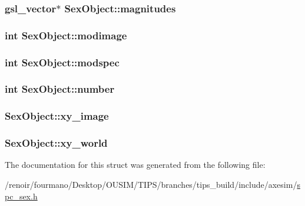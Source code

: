 \label{structSexObject_afbbb8f8bd937e942e0f9aa9560097b13}
\hypertarget{structSexObject_afcb11ccfb82237107b71410de52d9b79}{
\subsubsection[{magnitudes}]{\setlength{\rightskip}{0pt plus 5cm}gsl\_\-vector$\ast$ {\bf SexObject::magnitudes}}}
\label{structSexObject_afcb11ccfb82237107b71410de52d9b79}
\hypertarget{structSexObject_acfe99bcffce1874072c406bf4517cd07}{
\subsubsection[{modimage}]{\setlength{\rightskip}{0pt plus 5cm}int {\bf SexObject::modimage}}}
\label{structSexObject_acfe99bcffce1874072c406bf4517cd07}
\hypertarget{structSexObject_a0f462eb5c84b02f2bbdeb4d02dd76f5b}{
\subsubsection[{modspec}]{\setlength{\rightskip}{0pt plus 5cm}int {\bf SexObject::modspec}}}
\label{structSexObject_a0f462eb5c84b02f2bbdeb4d02dd76f5b}
\hypertarget{structSexObject_ad41b1dda3b8dba7dd6e53098efaafd23}{
\subsubsection[{number}]{\setlength{\rightskip}{0pt plus 5cm}int {\bf SexObject::number}}}
\label{structSexObject_ad41b1dda3b8dba7dd6e53098efaafd23}
\hypertarget{structSexObject_aeb623e63f7277a5f81f85f0d213c6bbd}{
\subsubsection[{xy\_\-image}]{ {\bf SexObject::xy\_\-image}}}
\label{structSexObject_aeb623e63f7277a5f81f85f0d213c6bbd}
\hypertarget{structSexObject_af314bec47ffaac3fe444f43a5f942d0d}{
\subsubsection[{xy\_\-world}]{ {\bf SexObject::xy\_\-world}}}
\label{structSexObject_af314bec47ffaac3fe444f43a5f942d0d}


The documentation for this struct was generated from the following file:\begin{DoxyCompactItemize}
\item 
/renoir/fourmano/Desktop/OUSIM/TIPS/branches/tips\_\-build/include/axesim/\hyperlink{spc__sex_8h}{spc\_\-sex.h}\end{DoxyCompactItemize}
